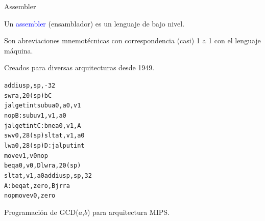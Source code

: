 \documentclass{beamer} %
\newcommand{\blue}[1]{\textcolor{blue}{#1}}
\begin{document}
\begin{frame}[fragile=singleslide]{Assembler}
   \begin{itemize}\small{
     \item Un \blue{assembler} (ensamblador) es un lenguaje de bajo nivel.
     \item Son abreviaciones mnemotécnicas con correspondencia (casi) 1 a 1 con el lenguaje máquina.
     \item Creados para diversas arquitecturas desde 1949.}
   \end{itemize}
  
   \scriptsize{\begin{alltt}
        addiu sp,sp,-32
        sw    ra,20(sp)        b      C
        jal   getint           subu   a0,a0,v1
        nop                 B: subu   v1,v1,a0
        jal   getint        C: bne    a0,v1,A
        sw    v0,28(sp)        slt    at,v1,a0
        lw    a0,28(sp)     D: jal    putint
        move  v1,v0            nop
        beq   a0,v0,D          lw     ra,20(sp)
        slt   at,v1,a0         addiu  sp,sp,32
     A: beq   at,zero,B        jr     ra
        nop                    move   v0,zero\end{alltt}}
    \scriptsize{Programación de GCD($a$,$b$) para arquitectura MIPS.}
\end{frame}
\end{document}
